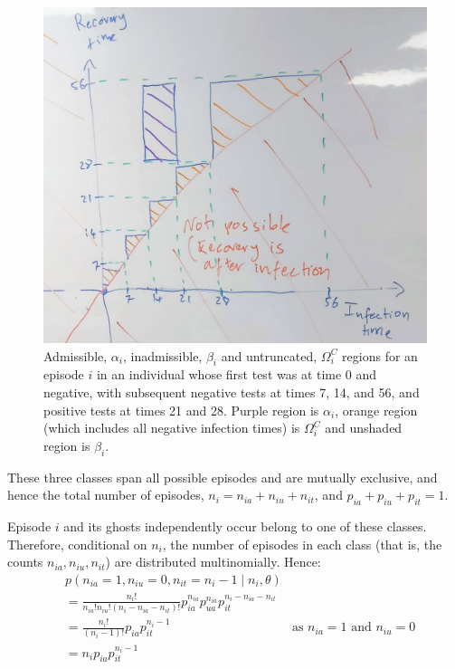 \documentclass[main.tex]{subfiles}
\begin{document}
\begin{figure}
\centering
\includegraphics[width=\textwidth]{cis-perfect-testing/images/likelihood_areas.jpg}
\caption{Admissible, $\alpha_i$, inadmissible, $\beta_i$ and
untruncated, $\Omega_i^C$ regions for an episode $i$ in an
individual whose first test was at time 0 and negative, with subsequent
negative tests at times 7, 14, and 56, and positive tests at times 21
and 28. Purple region is $\alpha_i$, orange region (which includes all
negative infection times) is $\Omega_i^C$ and unshaded region is
$\beta_i$.\label{fig:partitionSpace}}
\end{figure}

These three classes span all possible episodes and are mutually
exclusive, and hence the total number of episodes,
$n_i = n_{ia} + n_{iu} + n_{it}$, and
$p_{ia} + p_{iu} + p_{it} = 1$.

Episode $i$ and its ghosts independently occur belong to one of these
classes. Therefore, conditional on $n_i$, the number of episodes in
each class (that is, the counts $n_{ia}, n_{iu}, n_{it}$) are
distributed multinomially. Hence:
\begin{align}
&p(n_{ia} = 1, n_{iu} = 0, n_{it} = n_i - 1 \mid n_i, \theta) \\
&= \frac{n_i!}{n_{ia}! n_{iu}! (n_i- n_{ia} - n_{it})!} p_{ia}^{n_{ia}} p_{ua}^{n_{ia}} p_{it}^{n_i- n_{ia} - n_{it}} \\
&= \frac{n_i!}{(n_i-1)!} p_{ia} p_{it}^{n_i- 1} &\text{as $n_{ia} = 1$ and $n_{iu} = 0$}\\
&= n_i p_{ia} p_{it}^{n_i- 1}
\end{align}
\end{document}
